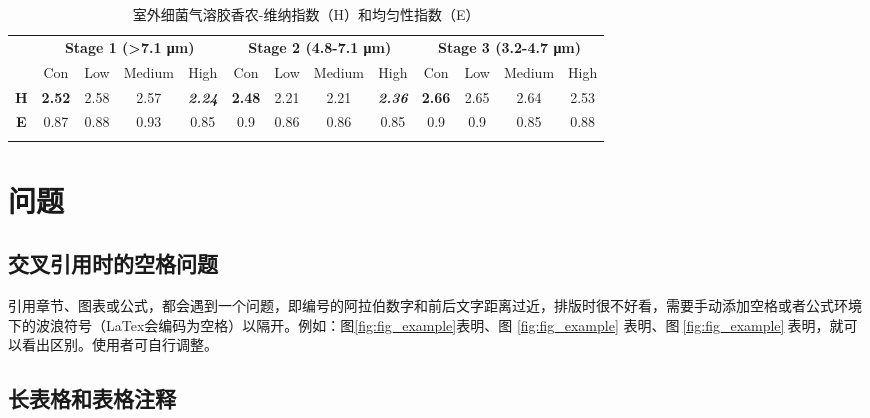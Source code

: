 \begin{table}[!htbp]
\centering
\caption{室外细菌气溶胶香农-维纳指数（H）和均匀性指数（E）\protect\footnotemark[1]}    %
\label{tab:table_example}
\renewcommand\arraystretch{1.6} %
\begin{tabular}{ccccccccccccc}  %
\Xhline{1.5pt}
\multirow{1}{*}{}   & \multicolumn{4}{c}{\textbf{Stage 1 (>7.1 μm)}}   & \multicolumn{4}{c}{\textbf{Stage 2 (4.8-7.1 μm)}} &  \multicolumn{4}{c}{\textbf{Stage 3 (3.2-4.7 μm)}}    \\  
\cline{2-13}
 &  Con &  Low &  Medium &  High &  Con &  Low &  Medium &  High &  Con &  Low &  Medium &  High  \\
 \hline
\textbf{H} &  \textbf{2.52} &  2.58 &  2.57 &  \textbf{\textit{2.24}} &  \textbf{2.48} &  2.21 &  2.21 &  \textbf{\textit{2.36}} &  \textbf{2.66} &  2.65 &  2.64 &  2.53 \\
\textbf{E} &  0.87 &  0.88 &  0.93 &  0.85 &  0.9 &  0.86 &  0.86 &  0.85 &  0.9 &  0.9 &  0.85 &  0.88 \\ 

\Xhline{1.5pt}
\end{tabular}
\end{table}


\section{问题}

\subsection{交叉引用时的空格问题}

引用章节、图表或公式，都会遇到一个问题，即编号的阿拉伯数字和前后文字距离过近，排版时很不好看，需要手动添加空格或者公式环境下的波浪符号（LaTex会编码为空格）以隔开。例如：图\ref{fig:fig_example}表明、图 \ref{fig:fig_example} 表明、图$~$\ref{fig:fig_example}$~$表明，就可以看出区别。使用者可自行调整。

\subsection{长表格和表格注释}

